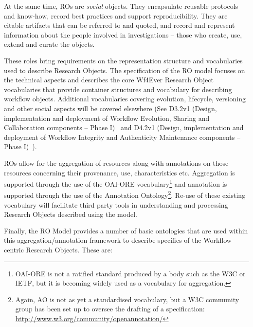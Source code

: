 At the same time, ROs are \emph{social} objects. They encapsulate reusable protocols and know-how, record best practices and support reproducibility. They are citable artifacts that can be referred to and quoted, and record and represent information about the people involved in investigations -- those who create, use, extend and curate the objects.

These roles bring requirements on the representation structure and vocabularies used to describe Research Objects. The specification of the RO model focuses on the technical aspects and describes the core Wf4Ever Research Object vocabularies that provide container structures and vocabulary for describing workflow objects. Additional vocabularies covering evolution, lifecycle, versioning and other social aspects will be covered elsewhere (See D3.2v1 (Design, implementation and deployment of Workflow Evolution, Sharing and Collaboration components -- Phase I)~\cite{D3.2v1} and 
D4.2v1 (Design, implementation and deployment of Workflow Integrity and Authenticity Maintenance components -- Phase I)~\cite{D4.2v1}). 


ROs allow for the aggregation of resources along with annotations on
those resources concerning their provenance, use, characteristics
etc. Aggregation is supported through the use of the OAI-ORE
vocabulary\footnote{OAI-ORE is not a ratified standard
  produced by a body such as the W3C or IETF, but it is becoming
  widely used as a vocabulary for aggregation.} and annotation is
supported through the use of the Annotation Ontology\footnote{Again,
  AO is not as yet a standardised vocabulary, but a W3C community
  group has been set up to oversee the drafting of a specification: \url{http://www.w3.org/community/openannotation/}}. Re-use of these existing vocabulary will facilitate third party tools in understanding and processing Research Objects described using the model. 


Finally, the RO Model provides a number of basic ontologies that are used within this aggregation/annotation framework to describe specifics of the Workflow-centric Research Objects. These are:

